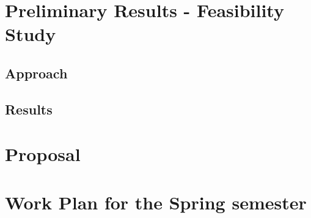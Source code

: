 \documentclass{layout/si-msc-proposal}
\begin{document}


    \section{Preliminary Results - Feasibility Study}\label{sec:preliminary-results---feasibility-study}
    

    \subsection{Approach}\label{subsec:approach}
    

    \subsection{Results}\label{subsec:results}
    


    \section{Proposal}\label{sec:proposal}


    \section{Work Plan for the Spring semester}\label{sec:work-plan-for-the-spring-semester}
    


    \newpage
    \nocite{*}
    
\end{document}
